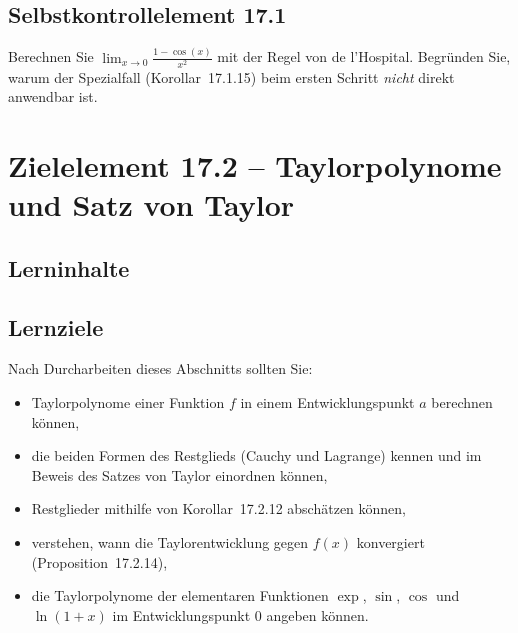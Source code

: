 \documentclass[a4paper,12pt]{article}
\begin{document}
\subsection*{Selbstkontrollelement 17.1}

Berechnen Sie $\displaystyle\lim_{x \to 0} \frac{1 - \cos(x)}{x^2}$ mit der Regel von de l'Hospital.
Begründen Sie, warum der Spezialfall (Korollar~17.1.15) beim ersten Schritt
\emph{nicht} direkt anwendbar ist.

\newpage

\section*{Zielelement 17.2 -- Taylorpolynome und Satz von Taylor}

\subsection*{Lerninhalte}

\begin{center}
\end{center}

\subsection*{Lernziele}

Nach Durcharbeiten dieses Abschnitts sollten Sie:
\begin{itemize}
  \item Taylorpolynome einer Funktion $f$ in einem Entwicklungspunkt $a$ berechnen können,
  \item die beiden Formen des Restglieds (Cauchy und Lagrange) kennen und im
        Beweis des Satzes von Taylor einordnen können,
  \item Restglieder mithilfe von Korollar~17.2.12 abschätzen können,
  \item verstehen, wann die Taylorentwicklung gegen $f(x)$ konvergiert
        (Proposition~17.2.14),
  \item die Taylorpolynome der elementaren Funktionen $\exp$, $\sin$, $\cos$ und
        $\ln(1+x)$ im Entwicklungspunkt 0 angeben können.
\end{itemize}
\end{document}
